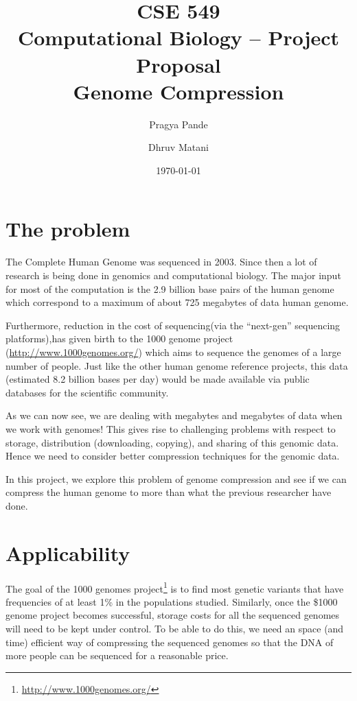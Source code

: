 \documentclass[11pt,twocolumn]{article}
\begin{document}
\title{CSE 549\\Computational Biology -- Project Proposal\\Genome Compression}
\author{Pragya Pande \and Dhruv Matani}
\date{\today}

\maketitle

\vspace{0.5in}

\section*{The problem}
The Complete Human Genome was sequenced in 2003. Since then a lot of
research is being done in genomics and computational biology. The
major input for most of the computation is the 2.9 billion base pairs
\cite{2}\cite{3} of the human genome which correspond to a maximum of about 
725 megabytes of data human genome.\cite{4}

Furthermore, reduction in the cost of sequencing(via the “next-gen” 
sequencing platforms),has given birth to the 1000 genome project
(\url{http://www.1000genomes.org/}) which aims to sequence the genomes of a large 
number of people. Just like the other human genome reference projects,
this data (estimated 8.2 billion bases per day) would be made
available via public databases for the scientific community.\cite{5}

As we can now see, we are dealing with megabytes and megabytes of data 
when we work with genomes! This gives rise to challenging 
problems with respect to storage, distribution (downloading, copying), 
and sharing of this genomic data. Hence we need to consider better 
compression techniques for the genomic data.

In this project, we explore this problem of genome compression and see
if we can compress the human genome to more than what the previous
researcher have done.\cite{6}

\section*{Applicability}

The goal of the 1000 genomes project\footnote{\url{http://www.1000genomes.org/}}
is to find most genetic variants that have frequencies of at least 1\%
in the populations studied. Similarly, once the \$1000 genome
project\cite{1000genomeproject} becomes successful, storage costs for
all the sequenced genomes will need to be kept under control. To be
able to do this, we need an space (and time) efficient way of
compressing the sequenced genomes so that the DNA of more people can
be sequenced for a reasonable price.
\end{document}
